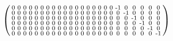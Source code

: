 \documentclass[pdftex,a4paper,parskip,listof=totoc,bibliography=totoc,onehalfspacing,12pt]{scrreprt}
\begin{document}
\begin{align*}
\begin{psmallmatrix}
0 & 0 & 0 & 0 & 0 & 0 & 0 & 0 & 0 & 0 & 0 & 0 & 0 & 0 & 0 & 0 & 0 & 0 & \text{-}1 & 0 & 0 & 0 & 0 & 0 \\
0 & 0 & 0 & 0 & 0 & 0 & 0 & 0 & 0 & 0 & 0 & 0 & 0 & 0 & 0 & 0 & 0 & 0 & 0 & \text{-}1 & 0 & 0 & 0 & 0 \\
0 & 0 & 0 & 0 & 0 & 0 & 0 & 0 & 0 & 0 & 0 & 0 & 0 & 0 & 0 & 0 & 0 & 0 & 0 & 0 & \text{-}1 & 0 & 0 & 0 \\
0 & 0 & 0 & 0 & 0 & 0 & 0 & 0 & 0 & 0 & 0 & 0 & 0 & 0 & 0 & 0 & 0 & 0 & 0 & 0 & 0 & \text{-}1 & 0 & 0 \\
0 & 0 & 0 & 0 & 0 & 0 & 0 & 0 & 0 & 0 & 0 & 0 & 0 & 0 & 0 & 0 & 0 & 0 & 0 & 0 & 0 & 0 & \text{-}1 & 0 \\
0 & 0 & 0 & 0 & 0 & 0 & 0 & 0 & 0 & 0 & 0 & 0 & 0 & 0 & 0 & 0 & 0 & 0 & 0 & 0 & 0 & 0 & 0 & \text{-}1 \\
\end{psmallmatrix}
\end{align*}
\end{document}
